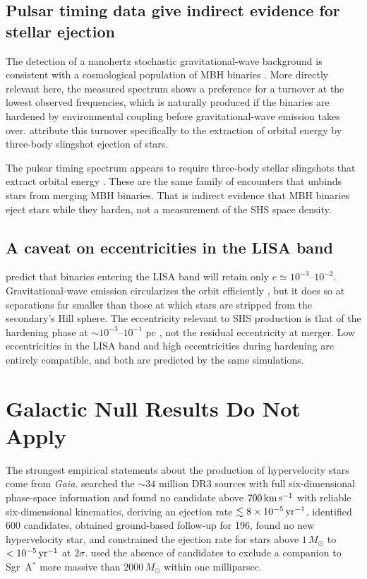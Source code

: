 \documentclass[twocolumn]{aastex701}
\newcommand{\kms}{\,{\rm km\,s^{-1}}}
\newcommand{\Msun}{\,M_{\odot}}
\begin{document}
\subsection{Pulsar timing data give indirect evidence for stellar ejection}

The detection of a nanohertz stochastic gravitational-wave background
\citep{nanograv23} is consistent with a cosmological population of MBH binaries
\citep{agazie23b}. More directly relevant here, the measured spectrum shows a
preference for a turnover at the lowest observed frequencies, which is naturally
produced if the binaries are hardened by environmental coupling before
gravitational-wave emission takes over. \citet{chen26} attribute this turnover
specifically to the extraction of orbital energy by three-body slingshot
ejection of stars.

The pulsar timing spectrum appears to require three-body stellar slingshots
that extract orbital energy \citep{chen26,sesana10}. These are the same family
of encounters that unbinds stars from merging MBH binaries. That is
indirect evidence that MBH binaries eject stars while they harden, not a
measurement of the SHS space density.

\subsection{A caveat on eccentricities in the LISA band}

\citet{zrake21} predict that binaries entering the LISA band will retain only
$e\simeq10^{-3}$--$10^{-2}$. Gravitational-wave emission circularizes the
orbit efficiently \citep{peters64}, but it does so at separations far smaller
than those at which stars are stripped from the secondary's Hill sphere. The eccentricity relevant
to SHS production is that of the hardening phase at $\sim10^{-3}$--$10^{-1}$ pc
\citep{sesana10,tiede24},
not the residual eccentricity at merger. Low eccentricities in the LISA band and high
eccentricities during hardening are entirely compatible, and both are predicted
by the same simulations.

\section{Galactic Null Results Do Not Apply}
\label{sec:null}

The strongest empirical statements about the production of hypervelocity stars come from
\textit{Gaia}. \citet{marchetti22} searched the $\sim\!34$ million DR3 sources
with full six-dimensional phase-space information and found no candidate above
$700\kms$ with reliable six-dimensional kinematics, deriving an ejection rate
$\lesssim8\times10^{-5}\,{\rm yr^{-1}}$. \citet{verberne24} identified 600
candidates, obtained ground-based follow-up for 196, found no
new hypervelocity star, and constrained the ejection rate for stars above
$1\Msun$ to $<10^{-5}\,{\rm yr^{-1}}$ at $2\sigma$. \citet{evans23} used the
absence of candidates to exclude a companion to Sgr~A$^{*}$ more massive than
$2000\Msun$ within one milliparsec.
\end{document}
